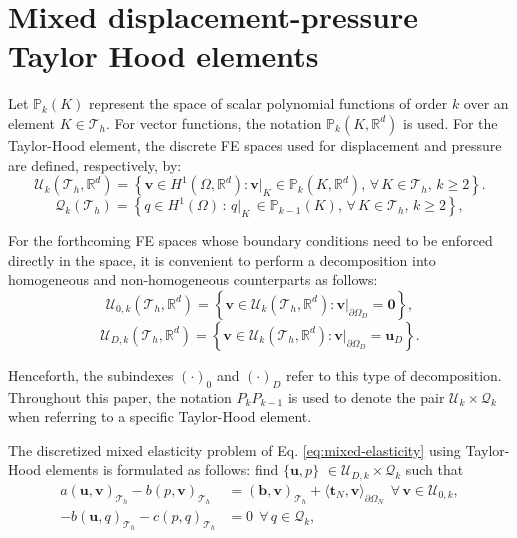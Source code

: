 \documentclass[english,11pt,3p,number,sort&compress]{elsarticle}
\begin{document}
\section{Mixed displacement-pressure Taylor Hood elements \label{sec:taylor-hood}}

Let $\mathbb{P}_k(K)$ represent the space of scalar polynomial functions of order $k$ over an element $K\in\mathcal{T}_h$. For vector functions, the notation $\mathbb{P}_k(K,\mathbb{R}^d)$ is used. For the Taylor-Hood element, the discrete FE spaces used for displacement and pressure are defined, respectively, by:
\begin{equation}
    \label{eq:uTH}
    \mathcal{U}_k(\mathcal{T}_h,\mathbb{R}^d) = \left\{\bm{v} \in H^1(\Omega,\mathbb{R}^d) : \bm{v}\lvert_{K} \in \mathbb{P}_k(K,\mathbb{R}^d), \,\forall \,K \in \mathcal{T}_h, \, k\geq 2 \right\}.
\end{equation}
\begin{equation}
    \label{eq:qTH}
    \mathcal{Q}_k(\mathcal{T}_h) = \left\{q \in H^1(\Omega) \,:\, q\lvert_{K} \, \in \mathbb{P}_{k-1}(K), \,\forall \, K \in \mathcal{T}_h, \, k\geq 2\right\},
\end{equation}

For the forthcoming FE spaces whose boundary conditions need to be enforced directly in the space, it is convenient to perform a decomposition into homogeneous and non-homogeneous counterparts as follows:
\begin{equation}
    \label{eq:uTH0}
    \mathcal{U}_{0,k}(\mathcal{T}_h,\mathbb{R}^d)=\left\{ \bm{v} \in \mathcal{U}_k(\mathcal{T}_h,\mathbb{R}^d) : \bm{v} \lvert_{\partial\Omega_D}=\bm{0}\right\},
\end{equation}
\begin{equation}
    \label{eq:uTHD}
    \mathcal{U}_{D,k}(\mathcal{T}_h,\mathbb{R}^d)=\left\{ \bm{v} \in \mathcal{U}_k(\mathcal{T}_h,\mathbb{R}^d) : \bm{v} \lvert_{\partial\Omega_D}=\bm{u}_D\right\}.
\end{equation}

\noindent Henceforth, the subindexes $(\cdot)_0$ and $(\cdot)_D$ refer to this type of decomposition. Throughout this paper, the notation $P_k P_{k-1}$ is used to denote the pair $\mathcal{U}_k \times \mathcal{Q}_k$ when referring to a specific Taylor-Hood element.

The discretized mixed elasticity problem of Eq. \eqref{eq:mixed-elasticity} using Taylor-Hood elements is formulated as follows: find $\{\bm{u},p\}$ $\in \mathcal{U}_{D,k} \times \mathcal{Q}_k$ such that
\begin{subequations} \label{eq:TH-weak}
	\begin{align}
		a\left(\bm{u},\bm{v}\right)_{\mathcal{T}_h} - b\left( p, \bm{v}\right)_{\mathcal{T}_h} &= \left(\bm{b},\bm{v}\right)_{\mathcal{T}_h} + \langle\bm{t}_N,\bm{v}\rangle_{\partial\Omega_N} ~~\forall\, \bm{v} \in \mathcal{U}_{0,k},\label{eq:TH-weak-a}\\ 
		-b\left(\bm{u}, q\right)_{\mathcal{T}_h} - c\left(p,q \right)_{\mathcal{T}_h} &= 0 ~~\forall\, q \in \mathcal{Q}_k, \label{eq:TH-weak-b}
	\end{align}
\end{subequations}
\end{document}
